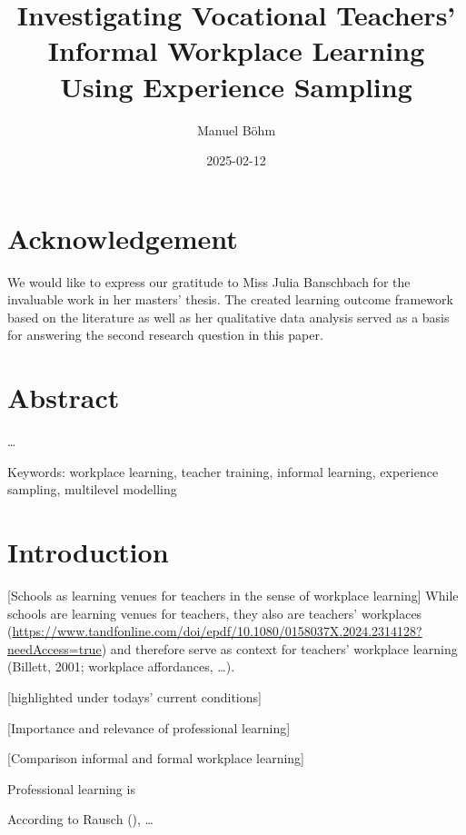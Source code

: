 \documentclass[
]{article}
\title{Investigating Vocational Teachers' Informal Workplace Learning
Using Experience Sampling}
\author{Manuel Böhm}
\date{2025-02-12}
\begin{document}
\maketitle

\renewcommand*\contentsname{Article Outline}
{
\setcounter{tocdepth}{2}
\tableofcontents
}
\newpage
{}

\section*{Acknowledgement}\label{acknowledgement}

We would like to express our gratitude to Miss Julia Banschbach for the
invaluable work in her masters' thesis. The created learning outcome
framework based on the literature as well as her qualitative data
analysis served as a basis for answering the second research question in
this paper.

\newpage

\section*{Abstract}\label{abstract}

\ldots{}

Keywords: workplace learning, teacher training, informal learning,
experience sampling, multilevel modelling

\newpage

\section{Introduction}\label{introduction}

{[}Schools as learning venues for teachers in the sense of workplace
learning{]} While schools are learning venues for teachers, they also
are teachers' workplaces
(\url{https://www.tandfonline.com/doi/epdf/10.1080/0158037X.2024.2314128?needAccess=true})
and therefore serve as context for teachers' workplace learning
(Billett, 2001; workplace affordances, \ldots).

{[}highlighted under todays' current conditions{]}

{[}Importance and relevance of professional learning{]}

{[}Comparison informal and formal workplace learning{]}

Professional learning is

According to Rausch
(), \ldots{}
\end{document}
